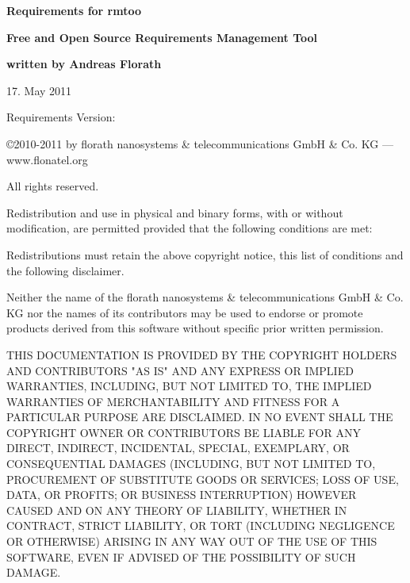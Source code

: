 \documentclass{report}
\begin{document}
\thispagestyle{empty}

\mbox{}

\vfill

{\LARGE\textbf{Requirements for rmtoo}}

\vspace{1cm}

{\Large\textbf{Free and Open Source Requirements Management Tool}}

\vfill

{\Large\textbf{written by Andreas Florath}}

\vfill

17. May 2011

\vfill

Requirements Version: 

\vfill

\newpage

\mbox{}

\vfill

{\small

\copyright 2010-2011 by florath nanosystems \& telecommunications GmbH 
\& Co. KG --- www.flonatel.org 

All rights reserved.

Redistribution and use in physical and binary forms, with or without
modification, are permitted provided that the following conditions are
met:

Redistributions must retain the above copyright notice, this list of
conditions and the following disclaimer.

Neither the name of the florath nanosystems \& telecommunications GmbH
\& Co. KG nor the names of its contributors may be used to endorse or
promote products derived from this software without specific prior
written permission.

THIS DOCUMENTATION IS PROVIDED BY THE COPYRIGHT HOLDERS AND
CONTRIBUTORS "AS IS" AND ANY EXPRESS OR IMPLIED WARRANTIES, INCLUDING,
BUT NOT LIMITED TO, THE IMPLIED WARRANTIES OF MERCHANTABILITY AND
FITNESS FOR A PARTICULAR PURPOSE ARE DISCLAIMED. IN NO EVENT SHALL THE
COPYRIGHT OWNER OR CONTRIBUTORS BE LIABLE FOR ANY DIRECT, INDIRECT,
INCIDENTAL, SPECIAL, EXEMPLARY, OR CONSEQUENTIAL DAMAGES (INCLUDING,
BUT NOT LIMITED TO, PROCUREMENT OF SUBSTITUTE GOODS OR SERVICES; LOSS
OF USE, DATA, OR PROFITS; OR BUSINESS INTERRUPTION) HOWEVER CAUSED AND
ON ANY THEORY OF LIABILITY, WHETHER IN CONTRACT, STRICT LIABILITY, OR
TORT (INCLUDING NEGLIGENCE OR OTHERWISE) ARISING IN ANY WAY OUT OF THE
USE OF THIS SOFTWARE, EVEN IF ADVISED OF THE POSSIBILITY OF SUCH
DAMAGE.
}
\newpage
\end{document}
